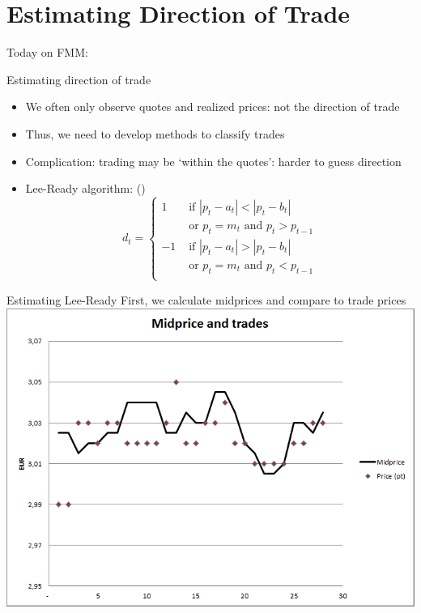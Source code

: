 \documentclass[english,10pt]{beamer}
\begin{document}
\section{Estimating Direction of Trade}

\begin{frame}{Today on FMM:}
\tableofcontents[currentsection]
\end{frame}


\begin{frame}{Estimating direction of trade}
	\begin{itemize}
		\item We often only observe quotes and realized prices: not the direction of trade
		\item Thus, we need to develop methods to classify trades
		\item Complication: trading may be `within the quotes': harder to guess direction
		\item \alert{Lee-Ready algorithm}: (\citet{lee_inferring_1991})
		\[
		d_t = \left\{
		\begin{aligned}
		1 & \text{ if } |p_t-a_t| < |p_t-b_t| \\
		&\text{ or } p_t=m_t \text{ and } p_t>p_{t-1}\\
		-1 & \text{ if } |p_t-a_t| > |p_t-b_t| \\
		& \text{ or } p_t=m_t \text{ and } p_t<p_{t-1} \\
		\end{aligned}
		\right.
		\]
	\end{itemize}
\end{frame}


\begin{frame}{Estimating Lee-Ready}
	First, we calculate midprices and compare to trade prices
	\center
	\includegraphics[scale=0.39]{pics/L2_midandtrade}
\end{frame}
\end{document}
